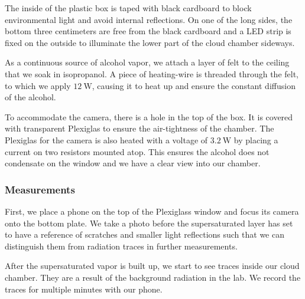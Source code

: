\documentclass[10pt,a4paper]{article}
\begin{document}
The inside of the plastic box is taped with black cardboard to block environmental light and avoid internal reflections. On one of the long sides, the bottom three centimeters are free from the black cardboard and a LED strip is fixed on the outside to illuminate the lower part of the cloud chamber sideways. 

As a continuous source of alcohol vapor, we attach a layer of felt to the ceiling that we soak in isopropanol. A piece of heating-wire is threaded through the felt, to which we apply \(\qty{12}{\watt}\), causing it to heat up and ensure the constant diffusion of the alcohol. 

To accommodate the camera, there is a hole in the top of the box. It is covered with transparent Plexiglas to ensure the air-tightness of the chamber. The Plexiglas for the camera is also heated with a voltage of $\qty{3.2}{\watt}$ by placing a current on two resistors mounted atop. This ensures the alcohol does not condensate on the window and we have a clear view into our chamber.

\subsubsection{Measurements}
First, we place a phone on the top of the Plexiglass window and focus its camera onto the bottom plate. We take a photo before the supersaturated layer has set to have a reference of scratches and smaller light reflections such that we can distinguish them from radiation traces in further measurements.

After the supersaturated vapor is built up, we start to see traces inside our cloud chamber. They are a result of the background radiation in the lab. We record the traces for multiple minutes with our phone.
\end{document}
